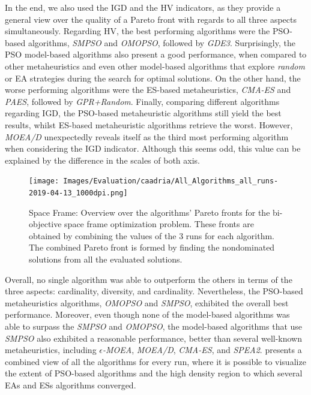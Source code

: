 In the end, we also used the \ac{IGD} and the \ac{HV} indicators, as they provide a general view over the quality of a Pareto front with regards to all three aspects simultaneously. Regarding \ac{HV}, the best performing algorithms were the \ac{PSO}-based algorithms, \textit{SMPSO} and \textit{OMOPSO}, followed by \textit{GDE3}. Surprisingly, the \ac{PSO} model-based algorithms also present a good performance, when compared to other metaheuristics and even other model-based algorithms that explore \textit{random} or \ac{EA} strategies during the search for optimal solutions. On the other hand, the worse performing algorithms were the \ac{ES}-based metaheuristics, \textit{CMA-ES} and \textit{PAES}, followed by \textit{GPR+Random}. Finally, comparing different algorithms regarding \ac{IGD}, the \ac{PSO}-based metaheuristic algorithms still yield the best results, whilst \ac{ES}-based metaheuristic algorithms retrieve the worst. However, \textit{MOEA/D} unexpectedly reveals itself as the third most performing algorithm when considering the \ac{IGD} indicator. Although this seems odd, this value can be explained by the difference in the scales of both axis.

\begin{figure}[htbp]
	\centering
	\texttt{[image: Images/Evaluation/caadria/All\_Algorithms\_all\_runs-2019-04-13\_1000dpi.png]}
	\caption[Space Frame: Overview over the algorithms' Pareto fronts]{Space Frame: Overview over the algorithms' Pareto fronts for the bi-objective space frame optimization problem. These fronts are obtained by combining the values of the 3 runs for each algorithm. The combined Pareto front is formed by finding the nondominated solutions from all the evaluated solutions.}
	\label{fig:allruns}
\end{figure}

Overall, no single algorithm was able to outperform the others in terms of the three aspects: cardinality, diversity, and cardinality. Nevertheless, the \ac{PSO}-based metaheuristics algorithms, \textit{OMOPSO} and \textit{SMPSO}, exhibited the overall best performance. Moreover, even though none of the model-based algorithms was able to surpass the \textit{SMPSO} and \textit{OMOPSO}, the model-based algorithms that use \textit{SMPSO} also exhibited a reasonable performance, better than several well-known metaheuristics, including \textit{$\epsilon$-MOEA}, \textit{MOEA/D}, \textit{CMA-ES}, and \textit{\ac{SPEA2}}.  presents a combined view of all the algorithms for every run, where it is possible to visualize the extent of \ac{PSO}-based algorithms and the high density region to which several \acp{EA} and \acp{ES} algorithms converged.


